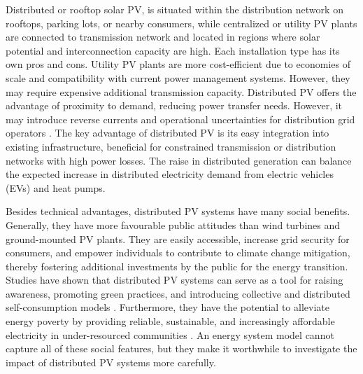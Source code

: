 \documentclass[review]{elsarticle}
\begin{document}
Distributed or rooftop solar PV, is situated within the distribution network on rooftops, parking lots, or nearby consumers, while centralized or utility PV plants are connected to transmission network and located in regions where solar potential and interconnection capacity are high. Each installation type has its own pros and cons. Utility PV plants are more cost-efficient due to economies of scale and compatibility with current power management systems. However, they may require expensive additional transmission capacity. Distributed PV offers the advantage of proximity to demand, reducing power transfer needs. However, it may introduce reverse currents and operational uncertainties for distribution grid operators \cite{wilkinson2021rooftop, van2018pv, burger_2019}. The key advantage of distributed PV is its easy integration into existing infrastructure, beneficial for constrained transmission or distribution networks with high power losses. The raise in distributed generation can balance the expected increase in distributed electricity demand from electric vehicles (EVs) and heat pumps. 

Besides technical advantages, distributed PV systems have many social benefits. Generally, they have more favourable public attitudes than wind turbines and ground-mounted PV plants. They are easily accessible, increase grid security for consumers, and empower individuals to contribute to climate change mitigation, thereby fostering additional investments by the public for the energy transition. Studies have shown that distributed PV systems can serve as a tool for raising awareness, promoting green practices, and introducing collective and distributed self-consumption models \cite{IEAPVPS_2021}. Furthermore, they have the potential to alleviate energy poverty by providing reliable, sustainable, and increasingly affordable electricity in under-resourced communities \cite{ o_2021, o_2021impact, fox_2023}. An energy system model cannot capture all of these social features, but they make it worthwhile to investigate the impact of distributed PV systems more carefully.
 
\end{document}

